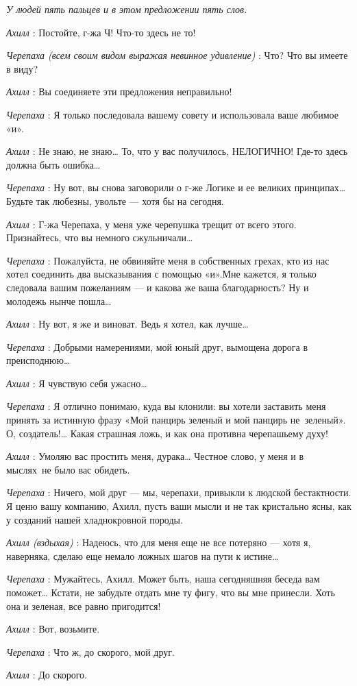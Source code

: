 \emph{У людей пять пальцев и в этом предложении пять слов.}

\emph{Ахилл} : Постойте, г-жа Ч! Что-то здесь не то!

\emph{Черепаха (всем своим видом выражая невинное удивление)} : Что? Что вы имеете в виду?

\emph{Ахилл} : Вы соединяете эти предложения неправильно!

\emph{Черепаха} : Я только последовала вашему совету и использовала ваше любимое «и».

\emph{Ахилл} : Не знаю, не знаю\ldots{} То, что у вас получилось, НЕЛОГИЧНО! Где-то здесь должна быть ошибка\ldots{}

\emph{Черепаха} : Ну вот, вы снова заговорили о г-же Логике и ее великих принципах\ldots{} Будьте так любезны, увольте --- хотя бы на сегодня.

\emph{Ахилл} : Г-жа Черепаха, у меня уже черепушка трещит от всего этого. Признайтесь, что вы немного сжульничали\ldots{}

\emph{Черепаха} : Пожалуйста, не обвиняйте меня в собственных грехах, кто из нас хотел соединить два высказывания с помощью «и».Мне кажется, я только следовала вашим пожеланиям --- и какова же ваша благодарность? Ну и молодежь нынче пошла\ldots{}

\emph{Ахилл} : Ну вот, я же и виноват. Ведь я хотел, как лучше\ldots{}

\emph{Черепаха} : Добрыми намерениями, мой юный друг, вымощена дорога в преисподнюю\ldots{}

\emph{Ахилл} : Я чувствую себя ужасно\ldots{}

\emph{Черепаха} : Я отлично понимаю, куда вы клонили: вы хотели заставить меня принять за истинную фразу «Мой панцирь зеленый и мой панцирь не~зеленый». О, создатель!\ldots{} Какая страшная ложь, и как она противна черепашьему духу!

\emph{Ахилл} : Умоляю вас простить меня, дурака\ldots{} Честное слово, у меня и в мыслях~не было вас обидеть.

\emph{Черепаха} : Ничего, мой друг --- мы, черепахи, привыкли к людской бестактности. Я ценю вашу компанию, Ахилл, пусть ваши мысли и не так кристально ясны, как у созданий нашей хладнокровной породы.

\emph{Ахилл (вздыхая)} : Надеюсь, что для меня еще не все потеряно --- хотя я, наверняка, сделаю еще немало ложных шагов на пути к истине\ldots{}

\emph{Черепаха} : Мужайтесь, Ахилл. Может быть, наша сегодняшняя беседа вам поможет\ldots{} Кстати, не забудьте отдать мне ту фигу, что вы мне принесли. Хоть она и зеленая, все равно пригодится!

\emph{Ахилл} : Вот, возьмите.

\emph{Черепаха} : Что ж, до скорого, мой друг.

\emph{Ахилл} : До скорого.

